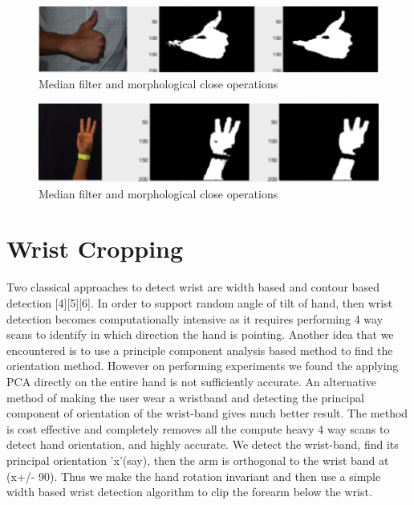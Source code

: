 \documentclass{acm} %
\begin{document}
\begin{figure}[h]
\centering
\includegraphics[width=3 in]{smoothening1}
\caption{Median filter and morphological close operations}
\label{fig:fig5}
\end{figure}

\begin{figure}[h]
\centering
\includegraphics[width=3 in]{smoothening2}
\caption{Median filter and morphological close operations}
\label{fig:fig6}
\end{figure}

\section{Wrist Cropping}
Two classical approaches to detect wrist are width based and contour based detection [4][5][6]. In order to support random angle of  tilt of hand, then wrist detection becomes computationally intensive as it requires performing  4 way scans to identify in which direction the hand is pointing.  Another idea that we encountered is to use a principle component analysis based method to find the orientation method. However on performing experiments we found the applying PCA directly on the entire hand is not sufficiently accurate. An alternative method of making the user wear a wristband and detecting the principal component of orientation of the wrist-band gives much better result. The method is cost effective and completely removes all the compute heavy 4 way scans to detect hand orientation, and highly accurate. We detect the wrist-band, find its principal orientation 'x'(say), then the arm is orthogonal to the wrist band at (x+/- 90). Thus we make the hand rotation invariant and then use a simple width based wrist detection algorithm to clip the forearm below the wrist.
\end{document}
